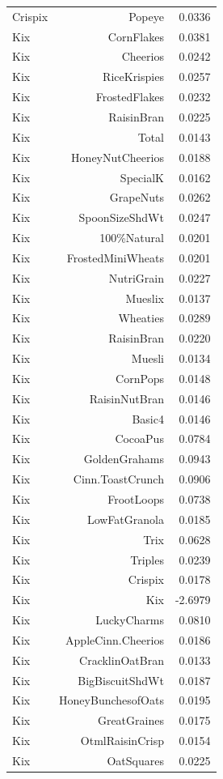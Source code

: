 \begin{longtable}{@{}lrr@{}}
Crispix & Popeye & 0.0336 \\
Kix & CornFlakes & 0.0381 \\
Kix & Cheerios & 0.0242 \\
Kix & RiceKrispies & 0.0257 \\
Kix & FrostedFlakes & 0.0232 \\
Kix & RaisinBran & 0.0225 \\
Kix & Total & 0.0143 \\
Kix & HoneyNutCheerios & 0.0188 \\
Kix & SpecialK & 0.0162 \\
Kix & GrapeNuts & 0.0262 \\
Kix & SpoonSizeShdWt & 0.0247 \\
Kix & 100\%Natural & 0.0201 \\
Kix & FrostedMiniWheats & 0.0201 \\
Kix & NutriGrain & 0.0227 \\
Kix & Mueslix & 0.0137 \\
Kix & Wheaties & 0.0289 \\
Kix & RaisinBran & 0.0220 \\
Kix & Muesli & 0.0134 \\
Kix & CornPops & 0.0148 \\
Kix & RaisinNutBran & 0.0146 \\
Kix & Basic4 & 0.0146 \\
Kix & CocoaPus & 0.0784 \\
Kix & GoldenGrahams & 0.0943 \\
Kix & Cinn.ToastCrunch & 0.0906 \\
Kix & FrootLoops & 0.0738 \\
Kix & LowFatGranola & 0.0185 \\
Kix & Trix & 0.0628 \\
Kix & Triples & 0.0239 \\
Kix & Crispix & 0.0178 \\
Kix & Kix & -2.6979 \\
Kix & LuckyCharms & 0.0810 \\
Kix & AppleCinn.Cheerios & 0.0186 \\
Kix & CracklinOatBran & 0.0133 \\
Kix & BigBiscuitShdWt & 0.0187 \\
Kix & HoneyBunchesofOats & 0.0195 \\
Kix & GreatGraines & 0.0175 \\
Kix & OtmlRaisinCrisp & 0.0154 \\
Kix & OatSquares & 0.0225 \\

\end{longtable}
